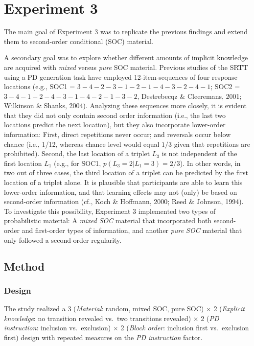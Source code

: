 \documentclass[man]{apa6}
\theoremstyle{definition}
\theoremstyle{definition}
\theoremstyle{definition}
\theoremstyle{remark}
\begin{document}
\section{Experiment 3}\label{experiment-3}

The main goal of Experiment 3 was to replicate the previous findings and
extend them to second-order conditional (SOC) material.

A secondary goal was to explore whether different amounts of implicit
knowledge are acquired with \emph{mixed} versus \emph{pure} SOC
material. Previous studies of the SRTT using a PD generation task have
employed 12-item-sequences of four response locations (e.g., SOC1 =
\(3{-}4{-}2{-}3{-}1{-}2{-}1{-}4{-}3{-}2{-}4{-}1\); SOC2 =
\(3{-}4{-}1{-}2{-}4{-}3{-}1{-}4{-}2{-}1{-}3{-}2\), Destrebecqz \&
Cleeremans, 2001; Wilkinson \& Shanks, 2004). Analyzing these sequences
more closely, it is evident that they did not only contain second order
information (i.e., the last two locations predict the next location),
but they also incorporate lower-order information: First, direct
repetitions never occur; and reversals occur below chance (i.e., 1/12,
whereas chance level would equal \(1/3\) given that repetitions are
prohibited). Second, the last location of a triplet \(L_3\) is not
independent of the first location \(L_1\) (e.g., for SOC1,
\(p(L_3 = 2 | L_1 = 3) = 2/3\)). In other words, in two out of three
cases, the third location of a triplet can be predicted by the first
location of a triplet alone. It is plausible that participants are able
to learn this lower-order information, and that learning effects may not
(only) be based on second-order information (cf., Koch \& Hoffmann,
2000; Reed \& Johnson, 1994). To investigate this possibility,
Experiment 3 implemented two types of probabilistic material: A
\emph{mixed SOC} material that incorporated both second-order and
first-order types of information, and another \emph{pure SOC} material
that only followed a second-order regularity.

\subsection{Method}\label{method-2}

\subsubsection{Design}\label{design-2}

The study realized a 3 (\emph{Material}: random, mixed SOC, pure SOC)
\(\times\) 2 (\emph{Explicit knowledge}: no transition revealed vs.~two
transitions revealed) \(\times\) 2 (\emph{PD instruction}: inclusion
vs.~exclusion) \(\times\) 2 (\emph{Block order}: inclusion first
vs.~exclusion first) design with repeated measures on the \emph{PD
instruction} factor.
\end{document}
